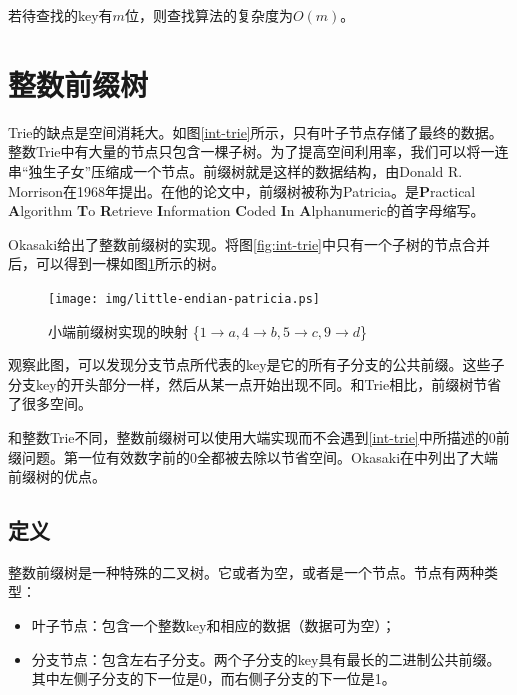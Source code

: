 \documentclass[b5paper]{ctexart}
\begin{document}
若待查找的key有$m$位，则查找算法的复杂度为$O(m)$。

\section{整数前缀树}
\label{int-patricia}

Trie的缺点是空间消耗大。如图\ref{int-trie}所示，只有叶子节点存储了最终的数据。整数Trie中有大量的节点只包含一棵子树。为了提高空间利用率，我们可以将一连串“独生子女”压缩成一个节点。前缀树就是这样的数据结构，由Donald R. Morrison在1968年提出。在他的论文中，前缀树被称为Patricia。是\textbf{P}ractical \textbf{A}lgorithm \textbf{T}o \textbf{R}etrieve \textbf{I}nformation \textbf{C}oded \textbf{I}n \textbf{A}lphanumeric的首字母缩写\cite{patricia-morrison}。

Okasaki给出了整数前缀树的实现\cite{okasaki-int-map}。将图\ref{fig:int-trie}中只有一个子树的节点合并后，可以得到一棵如图\ref{fig:little-endian-patricia}所示的树。

\begin{figure}[htbp]
  \centering
  \texttt{[image: img/little-endian-patricia.ps]}
  \caption{小端前缀树实现的映射
     \{$ 1 \rightarrow a, 4 \rightarrow b, 5 \rightarrow c, 9 \rightarrow d$\}}
  \label{fig:little-endian-patricia}
\end{figure}

观察此图，可以发现分支节点所代表的key是它的所有子分支的公共前缀。这些子分支key的开头部分一样，然后从某一点开始出现不同。和Trie相比，前缀树节省了很多空间。

和整数Trie不同，整数前缀树可以使用大端实现而不会遇到\ref{int-trie}中所描述的0前缀问题。第一位有效数字前的0全都被去除以节省空间。Okasaki在\cite{okasaki-int-map}中列出了大端前缀树的优点。

\subsection{定义}

整数前缀树是一种特殊的二叉树。它或者为空，或者是一个节点。节点有两种类型：

\begin{itemize}
\item 叶子节点：包含一个整数key和相应的数据（数据可为空）；
\item 分支节点：包含左右子分支。两个子分支的key具有最长的二进制公共前缀。其中左侧子分支的下一位是0，而右侧子分支的下一位是1。
\end{itemize}
\end{document}
